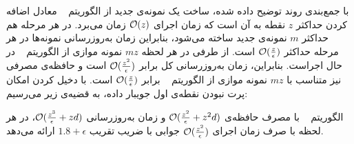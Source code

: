  با جمع‌بندی روند توضیح داده شده، ساخت یک نمونه‌ی جدید از الگوریتم ~ معادل اضافه کردن حداکثر $z$ نقطه به آن است که زمان اجرای $\mathcal{O}(z)$ زمان می‌برد. در هر مرحله هم حداکثر $m$ نمونه‌ی جدید ساخته می‌شود، بنابراین زمان به‌روزرسانی نمونه‌ها در هر مرحله حداکثر $\mathcal{O}(\frac{z}{\epsilon})$ است. از طرفی در هر لحظه $mz$ نمونه موازی از‌ الگوریتم ~ در حال اجراست. بنابراین، زمان به‌روزرسانی کل برابر $\mathcal{O}(\frac{z^2}{\epsilon})$ است و حافظه‌ی مصرفی نیز متناسب با $mz$ نمونه موازی از الگوریتم ~ برابر $\mathcal{O}(\frac{z}{\epsilon})$ است. با دخیل کردن امکان پرت نبودن نقطه‌ی اول جویبار داده، به قضیه‌ی زیر می‌رسیم:
 
 الگوریتم ~ با مصرف حافظه‌ی $\mathcal{O}(\frac{z^2}{\epsilon} + z^2d)$ و زمان به‌روزرسانی $\mathcal{O}(\frac{z^3}{\epsilon} + zd)$، در هر لحظه با صرف زمان اجرای $\mathcal{O}(\frac{z^2}{\epsilon})$ جوابی با ضریب تقریب $1.8 + \epsilon$ ارائه می‌دهد.










